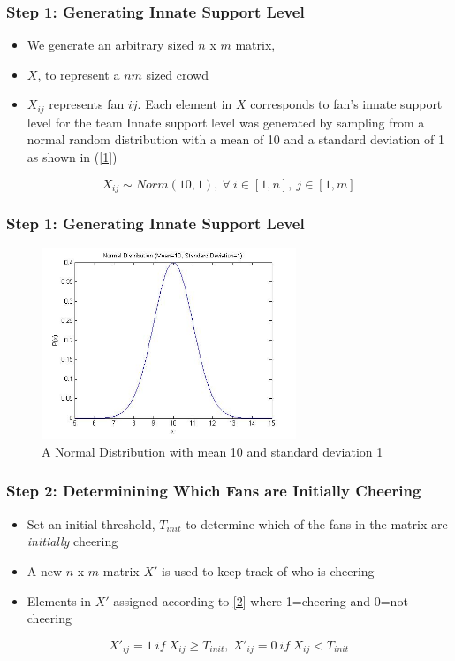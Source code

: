 \documentclass[compress,handout,10pt]{beamer}
\let\olditem\item
\renewcommand{\item}{\setlength{\itemsep}{0.5\baselineskip}\olditem}
\begin{document}
\begin{frame}
\frametitle{Step 1: Generating Innate Support Level}
\begin{itemize}
\item We generate an arbitrary sized $n$ x $m$ matrix,
\item  $X$, to represent a $nm$ sized crowd
\item   $X_{ij}$ represents fan $ij$. Each element in $X$ corresponds to fan's innate support level for the team
Innate support level was generated by sampling from a normal random distribution with a mean of 10 and a standard deviation of 1 as shown in (\ref{1})
\end{itemize} 
\begin{equation}
X_{ij}\sim Norm(10,1),~\forall~i\in[1,n],~j\in[1,m]
\label{1}
\end{equation}
\end{frame}

\begin{frame}
	\frametitle{Step 1: Generating Innate Support Level}
	\begin{figure}
		\begin{center}
		\includegraphics[width=3in] {NormDistribution.jpg}
		\end{center}
		\caption{A Normal Distribution with mean 10 and standard deviation 1}
		\label{fig:normdistribution}
	\end{figure}
\end{frame}

\begin{frame}
\frametitle{Step 2: Determinining Which Fans are Initially Cheering}
\begin{itemize}
\item Set an initial threshold, $T_{init}$ to determine which of the fans in the matrix are \textit{initially} cheering
\item A new $n$ x $m$ matrix $X'$ is used to keep track of who is cheering 
\item Elements in $X'$ assigned according to \eqref{2} where 1=cheering and 0=not cheering
\end{itemize}
\begin{equation}
X'_{ij}=1~if~X_{ij}\geq T_{init},~X'_{ij}=0~if~X_{ij}<T_{init}
\label{2}
\end{equation}
\end{frame}
\end{document}
